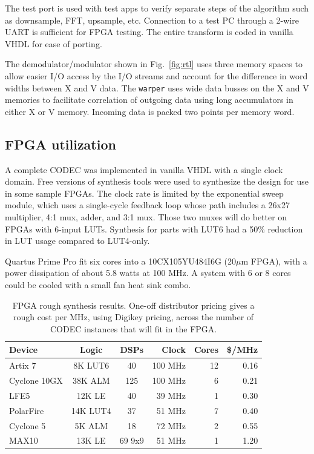 The test port is used with test apps to verify separate steps of the
algorithm such as downsample, FFT, upsample, etc.
Connection to a test PC through a 2-wire UART is sufficient for FPGA testing.
The entire transform is coded in vanilla VHDL for ease of porting.

The demodulator/modulator shown in Fig.~\ref{fig:rtl} uses three memory
spaces to allow easier I/O access by the I/O streams and account for the
difference in word widths between X and V data.
The \verb|warper| uses wide data busses on the X and V memories to facilitate
correlation of outgoing data using long accumulators in either X or V memory.
Incoming data is packed two points per memory word.

\subsection {FPGA utilization}

A complete CODEC was implemented in vanilla VHDL with a single clock domain.
Free versions of synthesis tools were used to synthesize the design for use in
some sample FPGAs.
The clock rate is limited by the exponential sweep module,
which uses a single-cycle feedback loop whose path includes a 26x27 multiplier,
4:1 mux, adder, and 3:1 mux. Those two muxes will do better on FPGAs with
6-input LUTs. Synthesis for parts with LUT6 had a 50\% reduction in LUT usage
compared to LUT4-only.

Quartus Prime Pro fit six cores into a 10CX105YU484I6G (20$\mu$m FPGA),
with a power dissipation of about 5.8 watts at 100 MHz.
A system with 6 or 8 cores could be cooled with a small fan heat sink combo.

\begin{table}[t]\centering
	\label{tab:FPGAfit}
	\caption{FPGA rough synthesis results. One-off distributor pricing gives a
	rough cost per MHz, using Digikey pricing, across the number of CODEC
	instances that will fit in the FPGA.}
	\centering
	\begin{tabular}{lccrrr}
		\hline\hline
		Device & Logic & DSPs & Clock & Cores & \$/MHz\\ [0.5ex]
		\hline
        Artix 7     & 8K LUT6 & 40   & 100 MHz & 12 & 0.16\\
		Cyclone 10GX& 38K ALM & 125  & 100 MHz &  6 & 0.21\\
		LFE5        & 12K LE  & 40    & 39 MHz &  1 & 0.30\\
        PolarFire   & 14K LUT4 & 37   & 51 MHz &  7 & 0.40\\
		Cyclone 5   & 5K ALM & 18     & 72 MHz &  2 & 0.55\\
		MAX10       & 13K LE & 69 9x9 & 51 MHz &  1 & 1.20\\
		\hline
	\end{tabular}
\end{table}

